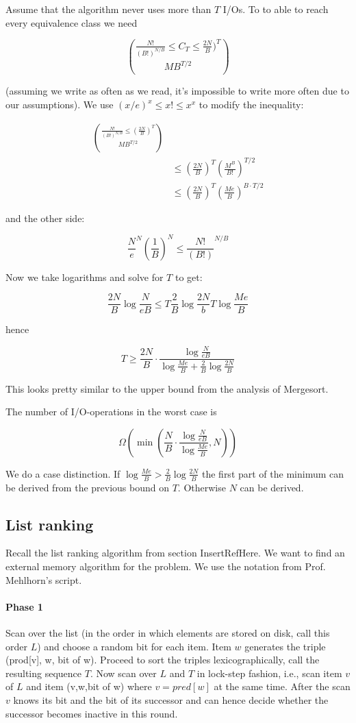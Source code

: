 Assume that the algorithm never uses more than $T$ I/Os. To to able to reach every equivalence class we need

\[\frac{N!}{(B!)^{N/B}} \leq C_T \leq \frac{2N}{B})^T \choose{M}{B}^{T/2}\]

(assuming we write as often as we read, it's impossible to write more often due to our assumptions). We use $(x/e)^x\leq x! \leq x^x$ to modify the inequality:

\begin{align*}
\frac{N!}{(B!)^{N/B}} \leq (\frac{2N}{B})^T \choose{M}{B}^{T/2}\\
	&\leq (\frac{2N}{B})^T (\frac{M^B}{B!})^{T/2}\\
	&\leq (\frac{2N}{B})^T (\frac{Me}{B})^{B \cdot T/2}
\end{align*}

and the other side:

\[\frac{N}{e}^N (\frac{1}{B})^N \leq \frac{N!}{(B!)}^{N/B}\]

Now we take logarithms and solve for $T$ to get:

\[\frac{2N}{B} \log \frac{N}{eB} \leq T\frac{2}{B} \log \frac{2N}{b}  T \log \frac{Me}{B}\]

hence

\[T\geq \frac{2N}{B} \cdot \frac{\log \frac{N}{eB}}{\log \frac{Me}{B} + \frac{2}{B} \log \frac{2N}{B}}\]

This looks pretty similar to the upper bound from the analysis of Mergesort.

\begin{thm} The number of I/O-operations in the worst case is 

\[\Omega(\min \left(\frac{N}{B} \cdot \frac{\log \frac{N}{eB}}{\log \frac{Me}{B}}, N\right))\]
\end{thm}

\begin{pr} We do a case distinction. If $\log \frac{Me}{B} > \frac 2B \log \frac{2N}{B}$ the first part of the minimum can be derived from the previous bound on $T$. Otherwise $N$ can be derived.
\end{pr}

\subsection{List ranking}

Recall the list ranking algorithm from section InsertRefHere. We want to find an external memory algorithm for the problem. We use the notation from Prof. Mehlhorn's script.

\paragraph{Phase 1} Scan over the list (in the order in which elements are stored on disk, call this order $L$) and choose a random bit for each item. Item $w$ generates the triple (prod[v], w, bit of w). Proceed to sort the triples lexicographically, call the resulting sequence $T$. Now scan over $L$ and $T$ in lock-step fashion, i.e., scan item $v$ of $L$ and item (v,w,bit of w) where $v=pred[w]$ at the same time. After the scan $v$ knows its bit and the bit of its successor and can hence decide whether the successor becomes inactive in this round.